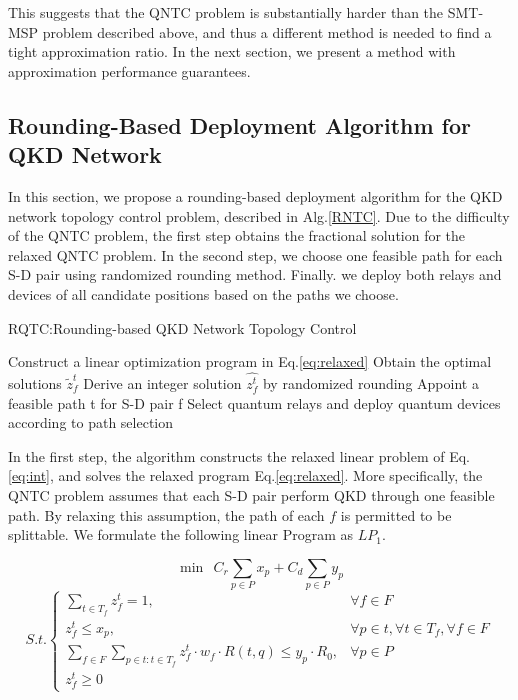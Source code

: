 This suggests that the QNTC problem is substantially harder than the SMT-MSP problem described above, and thus a different method is needed to find a tight approximation ratio. In the next section, we present a method with approximation performance guarantees.


\subsection{Rounding-Based Deployment Algorithm for QKD Network}
In this section, we propose a rounding-based deployment algorithm for the QKD network topology control problem, described in Alg.\ref{RNTC}. Due to the difficulty of the QNTC problem, the first step obtains the fractional solution for the relaxed QNTC problem. In the second step, we choose one feasible path for each S-D pair using randomized rounding method. Finally. we deploy both relays and devices of all candidate positions based on the paths we choose.

\begin{algorithm}[h]\label{RQTC}
\caption{RQTC:Rounding-based QKD Network Topology Control}
\begin{algorithmic}[1]
\STATE  Construct a linear optimization program in Eq.\ref{eq:relaxed}
\STATE Obtain the optimal solutions $\widetilde{z}_f^t$
\STATE Derive an integer solution $\hat{z_f^t}$ by randomized rounding
\STATE Appoint a feasible path t for S-D pair f
\ENDIF
\ENDFOR
\ENDFOR
\STATE Select quantum relays and deploy quantum devices according to path selection
\end{algorithmic}
\end{algorithm}

In the first step, the algorithm constructs the relaxed linear problem of Eq.\ref{eq:int}, and solves the relaxed program Eq.\ref{eq:relaxed}. More specifically, the QNTC problem assumes that each S-D pair perform QKD through one feasible path. By relaxing this assumption, the path of each $f$ is permitted to be splittable. We formulate the following linear Program as $LP_1$.

{\small
	\begin{equation*}
	\min \ \  C_r\sum_{p \in P}{x_p} + C_d\sum_{p \in P}{y_p}
	\end{equation*}
	\begin{equation}\label{eq:relaxed}
	{S.t.}\begin{cases}
     \sum_{t \in T_f}{z_f^t} = 1, & \forall f \in F \\
     z_f^t \le x_p, & \forall p \in t, \forall t \in T_f, \forall f \in F \\
     \sum_{f \in F}\sum_{p \in t:t \in T_f}{z_f^t \cdot w_f \cdot R(t,q)} \le  y_p \cdot R_0, & \forall p \in P \\
     z_f^t \ge 0
	\end{cases}
	\end{equation}
}

